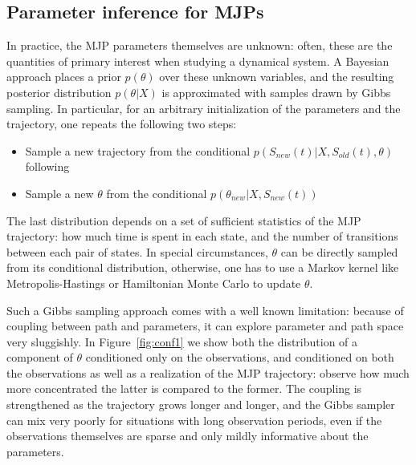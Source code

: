 \subsection{Parameter inference for MJPs}
In practice, the MJP parameters themselves are unknown: often,
these are the quantities of primary interest when studying a dynamical
system. A Bayesian approach
places a prior $p(\theta)$ over these unknown variables, and the
resulting posterior distribution $p(\theta|X)$ is approximated
with samples drawn by Gibbs sampling. In particular, for an arbitrary 
initialization of the parameters and the trajectory, one repeats the
following two steps:
\begin{itemize}
  \item Sample a new trajectory from the conditional 
    $p(S_{new}(t)|X,S_{old}(t),\theta)$ following \cite{RaoTeh12}
  \item Sample a new $\theta$ from the conditional $p(\theta_{new}|X,S_{new}(t))$
\end{itemize}
The last distribution depends on a set of sufficient statistics of the 
MJP trajectory: how
much time is spent in each state, and the number of transitions
between each pair of states. 
In special circumstances, $\theta$ can be directly sampled from its 
conditional distribution, otherwise, one has to use a Markov kernel like
Metropolis-Hastings or Hamiltonian Monte Carlo to update $\theta$. 

Such a Gibbs sampling approach comes with a well known limitation:
because of coupling between path and parameters, it can explore parameter 
and path space very sluggishly. In Figure~\ref{fig:conf1} we show
both the distribution of a component of $\theta$ conditioned
only on the observations, and conditioned on both the observations 
as well as a realization of the MJP trajectory: observe how much
more concentrated the latter is compared to the former. The
coupling is strengthened as the trajectory grows longer and longer, and
the Gibbs sampler can mix very poorly for situations with
long observation periods, even if the observations themselves are
sparse and only mildly informative about the parameters.

